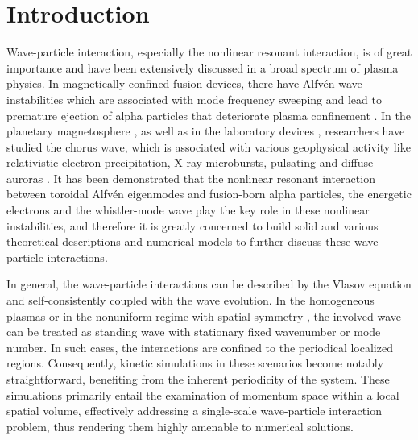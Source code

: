 \section{Introduction}
Wave-particle interaction, especially the nonlinear resonant interaction, is of great importance and have been extensively discussed in a broad spectrum of plasma physics. 
In magnetically confined fusion devices, there have Alfv\'en wave instabilities \cite{chen2016,wang2018} which are associated with mode frequency sweeping and lead to premature ejection of alpha particles that deteriorate plasma confinement \cite{fasoli2007}.
In the planetary magnetosphere \cite{tsurutani1974}, as well as in the laboratory devices \cite{vancompernolle2015,vancompernolle2017a}, researchers have studied the chorus wave, which is associated with various geophysical activity like relativistic electron precipitation, X-ray microbursts, pulsating and diffuse auroras \cite{kasahara2018,reeves2013,thorne2013}.
It has been demonstrated that the nonlinear resonant interaction between toroidal Alfv\'en eigenmodes and fusion-born alpha particles, the energetic electrons and the whistler-mode wave play the key role in these nonlinear instabilities, and therefore it is greatly concerned to build solid and various theoretical descriptions and numerical models to further discuss these wave-particle interactions.

In general, the wave-particle interactions can be described by the Vlasov equation and self-consistently coupled with the wave evolution. 
In the homogeneous plasmas \cite{lilley2009,breizman2010} or in the nonuniform regime with spatial symmetry \cite{hezaveh2017,hezaveh2020,hezaveh2021}, the involved wave can be treated as standing wave with stationary fixed wavenumber or mode number. 
In such cases, the interactions are confined to the periodical localized regions. Consequently, kinetic simulations in these scenarios become notably straightforward, benefiting from the inherent periodicity of the system. These simulations primarily entail the examination of momentum space within a local spatial volume, effectively addressing a single-scale wave-particle interaction problem, thus rendering them highly amenable to numerical solutions.


